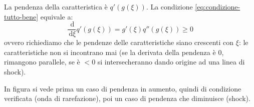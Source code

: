 \documentclass[10pt,a4paper,twoside,openright]{book}
\newcommand{\de}{\,\mathrm d}
\newcommand{\dxi}{\de \xi}
\begin{document}
\begin{nb}
    La pendenza della caratteristica è $\displaystyle q'(g(\xi)) .$ La condizione \eqref{eq:condizione-tutto-bene} equivale a:
    \begin{equation*}
        \frac{\de}{\dxi } q'(g(\xi)) =g'(\xi) q''(g(\xi)) \geqslant 0
    \end{equation*}
    ovvero richiediamo che le pendenze delle caratteristiche siano crescenti con $\xi $: le caratteristiche non si incontrano mai (se la derivata della pendenza è $0$, rimangono parallele, se è $< 0$ si intersecheranno dando origine ad una linea di shock).

    In figura si vede prima un caso di pendenza in aumento, quindi di condizione verificata (onda di rarefazione), poi un caso di pendenza che diminuisce (shock).

    \begin{figure}[H]
        \centering

        \begin{tikzpicture}[x=0.75pt,y=0.75pt,yscale=-1,xscale=1]


\end{tikzpicture}
\end{figure}
\end{nb}
\end{document}
